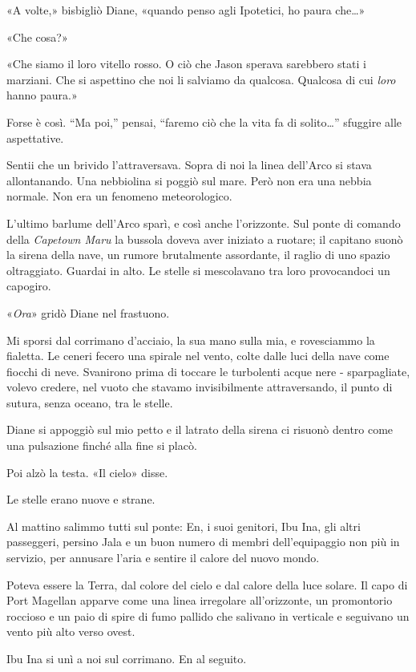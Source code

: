 «A volte,» bisbigliò Diane, «quando penso agli Ipotetici, ho paura
che\ldots»

«Che cosa?»

«Che siamo il loro vitello rosso. O ciò che Jason sperava sarebbero
stati i marziani. Che si aspettino che noi li salviamo da qualcosa.
Qualcosa di cui \emph{loro} hanno paura.»

Forse è così. ``Ma poi,'' pensai, ``faremo ciò che la vita fa di
solito\ldots'' sfuggire alle aspettative.

Sentii che un brivido l'attraversava. Sopra di noi la linea dell'Arco si
stava allontanando. Una nebbiolina si poggiò sul mare. Però non era una
nebbia normale. Non era un fenomeno meteorologico.

L'ultimo barlume dell'Arco sparì, e così anche l'orizzonte. Sul ponte di
comando della \emph{Capetown Maru} la bussola doveva aver iniziato a
ruotare; il capitano suonò la sirena della nave, un rumore brutalmente
assordante, il raglio di uno spazio oltraggiato. Guardai in alto. Le
stelle si mescolavano tra loro provocandoci un capogiro.

«\emph{Ora}» gridò Diane nel frastuono.

Mi sporsi dal corrimano d'acciaio, la sua mano sulla mia, e rovesciammo
la fialetta. Le ceneri fecero una spirale nel vento, colte dalle luci
della nave come fiocchi di neve. Svanirono prima di toccare le
turbolenti acque nere - sparpagliate, volevo credere, nel vuoto che
stavamo invisibilmente attraversando, il punto di sutura, senza oceano,
tra le stelle.

Diane si appoggiò sul mio petto e il latrato della sirena ci risuonò
dentro come una pulsazione finché alla fine si placò.

Poi alzò la testa. «Il cielo» disse.

Le stelle erano nuove e strane.

\separatorefiori

Al mattino salimmo tutti sul ponte: En, i suoi genitori, Ibu Ina, gli
altri passeggeri, persino Jala e un buon numero di membri
dell'equipaggio non più in servizio, per annusare l'aria e sentire il
calore del nuovo mondo.

Poteva essere la Terra, dal colore del cielo e dal calore della luce
solare. Il capo di Port Magellan apparve come una linea irregolare
all'orizzonte, un promontorio roccioso e un paio di spire di fumo
pallido che salivano in verticale e seguivano un vento più alto verso
ovest.

Ibu Ina si unì a noi sul corrimano. En al seguito.

